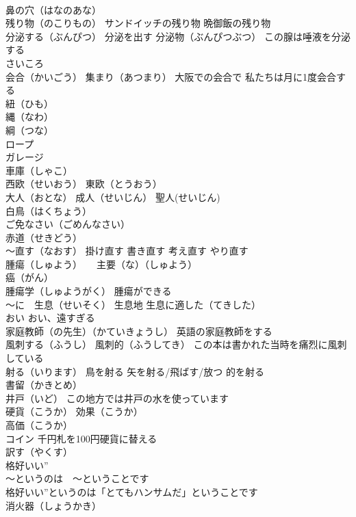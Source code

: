 \documentclass[8pt]{extreport}
\begin{document}
\begin{CJK}{UTF8}{min}
\\	鼻の穴（はなのあな）
\\	残り物（のこりもの） サンドイッチの残り物 晩御飯の残り物
\\	分泌する（ぶんぴつ） 分泌を出す 分泌物（ぶんぴつぶつ） この腺は唾液を分泌する
\\	さいころ
\\	会合（かいごう） 集まり（あつまり） 大阪での会合で 私たちは月に1度会合する
\\	紐（ひも） 
\\	縄（なわ）
\\	綱（つな）
\\	ロープ 
\\	ガレージ　
\\	車庫（しゃこ） 
\\	西欧（せいおう） 東欧（とうおう）
\\	大人（おとな） 成人（せいじん） 聖人(せいじん)　
\\	白鳥（はくちょう）
\\	ご免なさい（ごめんなさい）
\\	赤道（せきどう）
\\	～直す（なおす） 掛け直す 書き直す 考え直す やり直す
\\	腫瘍（しゅよう）　　主要（な）（しゅよう）
\\	癌（がん）
\\	腫瘍学（しゅようがく） 腫瘍ができる
\\	～に　生息（せいそく） 生息地 生息に適した（てきした）
\\	おい おい、遠すぎる
\\	家庭教師（の先生）（かていきょうし） 英語の家庭教師をする
\\	風刺する（ふうし） 風刺的（ふうしてき） この本は書かれた当時を痛烈に風刺している
\\	射る（いります） 鳥を射る 矢を射る/飛ばす/放つ 的を射る
\\	書留（かきとめ）
\\	井戸（いど） この地方では井戸の水を使っています
\\	硬貨（こうか） 効果（こうか）
\\	高価（こうか）
\\	コイン 千円札を100円硬貨に替える
\\	訳す（やくす）
\\	格好いい” 
\\	～というのは　～ということです 
\\	格好いい”というのは「とてもハンサムだ」ということです
\\	消火器（しょうかき）

\end{CJK}
\end{document}
